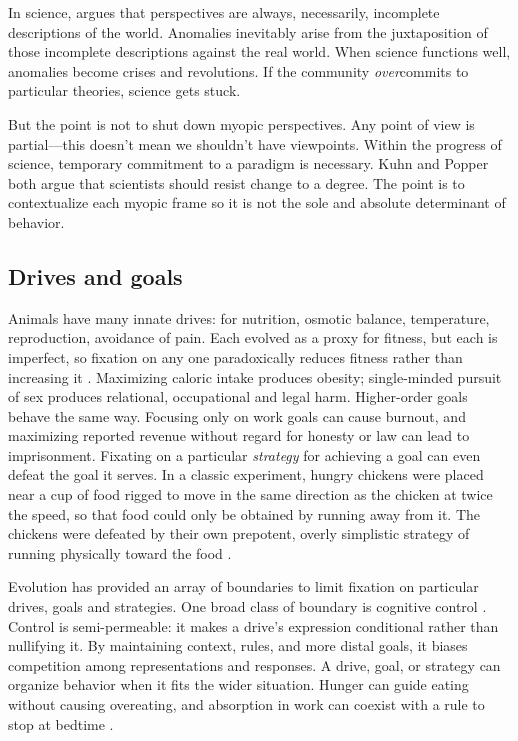 \documentclass[11pt]{article}
\begin{document}
In science, \cite{kuhn1970structure} argues that perspectives are always, necessarily, incomplete descriptions of the world. Anomalies inevitably arise from the juxtaposition of those incomplete descriptions against the real world. When science functions well, anomalies become crises and revolutions. If the community \textit{over}commits to particular theories, science gets stuck.

But the point is not to shut down myopic perspectives. Any point of view is partial---this doesn't mean we shouldn't have viewpoints. Within the progress of science, temporary commitment to a paradigm is necessary. Kuhn and Popper \citep{popper1975rationality} both argue that scientists should resist change to a degree.  The point is to contextualize each myopic frame so it is not the sole and absolute determinant of behavior. 



\subsection{Drives and goals} 

Animals have many innate drives: for nutrition, osmotic balance, temperature, reproduction, avoidance of pain. Each evolved as a proxy for fitness, but each is imperfect, so fixation on any one paradoxically reduces fitness rather than increasing it \citep{kurthnelson2024dynamic, john2023dead, mcfarland1975behavioural}. Maximizing caloric intake produces obesity; single-minded pursuit of sex produces relational, occupational and legal harm. Higher-order goals behave the same way. Focusing only on work goals can cause burnout, and maximizing reported revenue without regard for honesty or law can lead to imprisonment. Fixating on a particular \textit{strategy} for achieving a goal can even defeat the goal it serves. In a classic experiment, hungry chickens were placed near a cup of food rigged to move in the same direction as the chicken at twice the speed, so that food could only be obtained by running away from it. The chickens were defeated by their own prepotent, overly simplistic strategy of running physically toward the food \citep{hershberger1986approach, dayan2006misbehavior}.

Evolution has provided an array of boundaries to limit fixation on particular drives, goals and strategies. One broad class of boundary is cognitive control \citep{botvinick2001conflict, diamond2013executive}. Control is semi-permeable: it makes a drive's expression conditional rather than nullifying it. By maintaining context, rules, and more distal goals, it biases competition among representations and responses. A drive, goal, or strategy can organize behavior when it fits the wider situation. Hunger can guide eating without causing overeating, and absorption in work can coexist with a rule to stop at bedtime \citep{miller2001integrative,braver2012variable}.
\end{document}
